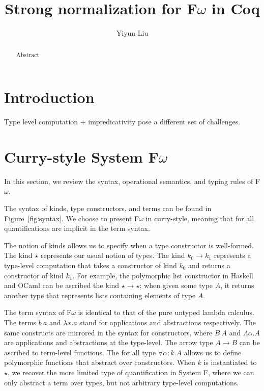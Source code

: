 \documentclass[acmsmall, nonacm=true]{acmart}
\title{Strong normalization for F$\omega$ in Coq}
\author{Yiyun Liu}
\affiliation{%
  \institution{University of Pennsylvania}
  \city{Philadelphia}
  \country{USA}
}
\begin{document}
\begin{abstract}
  Abstract
\end{abstract}

\maketitle


\section{Introduction}
Type level computation + impredicativity pose a different set of challenges.

\section{Curry-style System F$\omega$}
In this section, we review the syntax, operational semantics, and
typing rules of F$\omega$.

The syntax of kinds, type constructors, and terms can be found in Figure~\ref{fig:syntax}.
We choose to present F$\omega$ in
curry-style, meaning that for all quantifications are implicit in the
term syntax. %

The notion of kinds allows us to specify when a type constructor is
well-formed. The kind $\star$ represents our usual notion of
types. The kind $k_0 \rightarrow k_1$ represents a type-level
computation that takes a constructor of kind $k_0$ and returns a
constructor of kind $k_1$. For example, the polymorphic list
constructor in Haskell and OCaml can be ascribed the kind $\star
\rightarrow \star$; when given some type $A$, it returns another type that
represents lists containing elements of type $A$.

The term syntax of F$\omega$ is identical to that of the pure untyped
lambda calculus. The terms $b\ a$ and $\lambda x . a$ stand for
applications and abstractions respectively.
The same constructs are mirrored in the syntax for constructors, where $B\ A$ and
$\Lambda \alpha . A$ are applications and abstractions at the
type-level. The arrow type $A \rightarrow B$ can be ascribed to
term-level functions. The for all type $\forall \alpha : k . A$ allows
us to define polymorphic functions that abstract over
constructors. When $k$ is instantiated to $\star$, we recover the more
limited type of quantification in System F, where we can only abstract
a term over types, but not arbitrary type-level computations.
\end{document}
